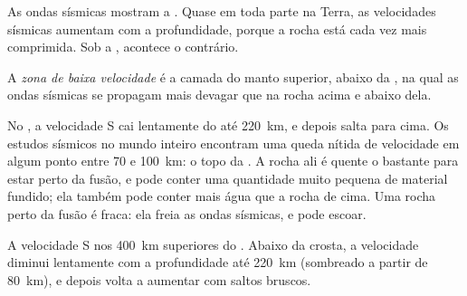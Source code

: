 As ondas sísmicas mostram a . Quase em toda parte na Terra, as
velocidades sísmicas aumentam com a profundidade, porque a rocha está cada
vez mais comprimida. Sob a , acontece o contrário.

\begin{definition}\label{def:g11:lithosphere-asthenosphere:lvz}
A \emph{zona de baixa velocidade} é a camada
do manto superior, abaixo da , na qual as ondas sísmicas se
propagam mais devagar que na rocha acima e abaixo dela.
\end{definition}

No , a velocidade S cai lentamente do  até
\qty{220}{km}, e depois salta para cima. Os estudos sísmicos no mundo inteiro
encontram uma queda nítida de velocidade em algum ponto entre 70 e
\qty{100}{km}: o topo da . A rocha ali é quente o bastante para
estar perto da fusão, e pode conter uma quantidade muito pequena de material
fundido; ela também pode conter mais água que a rocha de cima. Uma rocha
perto da fusão é fraca: ela freia as ondas sísmicas, e pode escoar.

\begin{omfigure}

{\small A velocidade S nos \qty{400}{km} superiores do . Abaixo da crosta, a velocidade diminui lentamente com a
profundidade até \qty{220}{km} (sombreado a partir de \qty{80}{km}), e
depois volta a aumentar com saltos bruscos.}
\end{omfigure}

